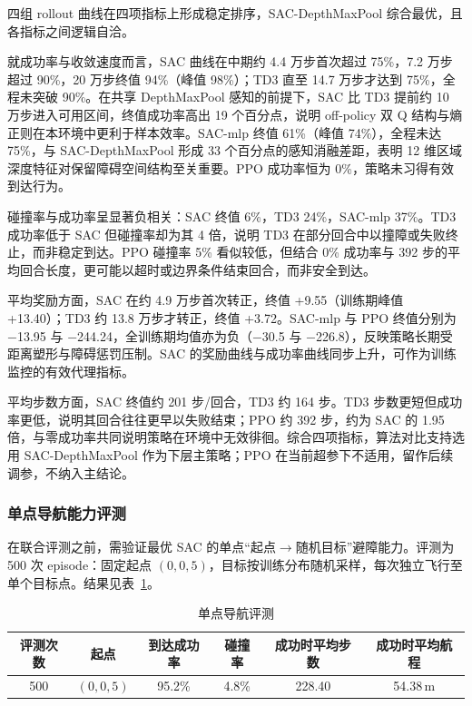 四组 rollout 曲线在四项指标上形成稳定排序，SAC-DepthMaxPool 综合最优，且各指标之间逻辑自洽。

就成功率与收敛速度而言，SAC 曲线在中期约 4.4 万步首次超过 75\%，7.2 万步超过 90\%，20 万步终值 94\%（峰值 98\%）；TD3 直至 14.7 万步才达到 75\%，全程未突破 90\%。在共享 DepthMaxPool 感知的前提下，SAC 比 TD3 提前约 10 万步进入可用区间，终值成功率高出 19 个百分点，说明 off-policy 双 Q 结构与熵正则在本环境中更利于样本效率。SAC-mlp 终值 61\%（峰值 74\%），全程未达 75\%，与 SAC-DepthMaxPool 形成 33 个百分点的感知消融差距，表明 12 维区域深度特征对保留障碍空间结构至关重要。PPO 成功率恒为 0\%，策略未习得有效到达行为。

碰撞率与成功率呈显著负相关：SAC 终值 6\%，TD3 24\%，SAC-mlp 37\%。TD3 成功率低于 SAC 但碰撞率却为其 4 倍，说明 TD3 在部分回合中以撞障或失败终止，而非稳定到达。PPO 碰撞率 5\% 看似较低，但结合 0\% 成功率与 392 步的平均回合长度，更可能以超时或边界条件结束回合，而非安全到达。

平均奖励方面，SAC 在约 4.9 万步首次转正，终值 +9.55（训练期峰值 +13.40）；TD3 约 13.8 万步才转正，终值 +3.72。SAC-mlp 与 PPO 终值分别为 $-$13.95 与 $-$244.24，全训练期均值亦为负（$-$30.5 与 $-$226.8），反映策略长期受距离塑形与障碍惩罚压制。SAC 的奖励曲线与成功率曲线同步上升，可作为训练监控的有效代理指标。

平均步数方面，SAC 终值约 201 步/回合，TD3 约 164 步。TD3 步数更短但成功率更低，说明其回合往往更早以失败结束；PPO 约 392 步，约为 SAC 的 1.95 倍，与零成功率共同说明策略在环境中无效徘徊。综合四项指标，算法对比支持选用 SAC-DepthMaxPool 作为下层主策略；PPO 在当前超参下不适用，留作后续调参，不纳入主结论。

\subsubsection{单点导航能力评测}

在联合评测之前，需验证最优 SAC 的单点``起点$\to$随机目标''避障能力。评测为 500 次 episode：固定起点 $(0,0,5)$，目标按训练分布随机采样，每次独立飞行至单个目标点。结果见表~\ref{tab:nav-single}。

\begin{table}[htbp]
  \centering
  \caption{单点导航评测}
  \label{tab:nav-single}
  \begin{tabular}{cccccc}
    \toprule
    评测次数 & 起点 & 到达成功率 & 碰撞率 & 成功时平均步数 & 成功时平均航程 \\
    \midrule
    500 & $(0,0,5)$ & 95.2\% & 4.8\% & 228.40 & 54.38\,m \\
    \bottomrule
  \end{tabular}

\end{table}

